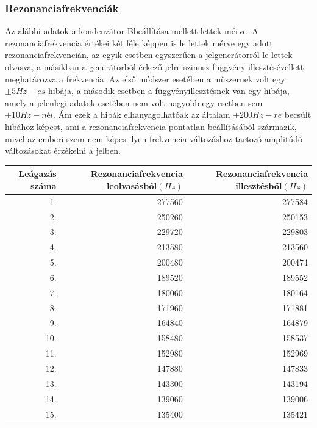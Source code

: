 \documentclass[10pt,pdftex]{report}
\begin{document}
\subsubsection{Rezonanciafrekvenciák}
Az alábbi adatok a kondenzátor B\footnotemark beállítása mellett lettek mérve.\newline
A rezonanciafrekvencia értékei két féle képpen is le lettek mérve egy adott rezonanciafrekvencián, az egyik esetben egyszerűen a jelgenerátorról le lettek olvasva, a másikban 
a generátorból érkező jelre szinusz függvény illesztésével\footnotemark lett meghatározva a frekvencia. Az első módszer esetében a műszernek volt egy $\pm5Hz-es$ hibája, a második esetben 
a függvényillesztésnek van egy hibája, amely a jelenlegi adatok esetében nem volt nagyobb egy esetben sem $\pm10Hz-nél$. Ám ezek a hibák elhanyagolhatóak az általam $\pm200Hz-re$ 
becsült hibához képest, ami a rezonanciafrekvencia pontatlan beállításából származik, mivel az emberi szem nem képes ilyen frekvencia változáshoz tartozó amplitúdó változásokat 
érzékelni a jelben.  \newline
\begin{centering}
    \centering
    \begin{tabular}{|r|r|r|}
        \hline
        Leágazás száma & Rezonanciafrekvencia leolvasásból$(Hz)$ & Rezonanciafrekvencia illesztésből$(Hz)$ \\
        \hline
        1. & 277560 & 277584 \\
        \hline
        2. & 250260 & 250153 \\
        \hline
        3. & 229720 & 229803 \\
        \hline
        4. & 213580 & 213560 \\
        \hline
        5. & 200480 & 200474 \\
        \hline
        6. & 189520 & 189552 \\
        \hline
        7. & 180060 & 180164 \\
        \hline
        8. & 171960 & 171881 \\
        \hline
        9. & 164840 & 164879 \\
        \hline
        10. & 158480 & 158537 \\
        \hline
        11. & 152980 & 152969 \\
        \hline
        12. & 147880 & 147833 \\
        \hline
        13. & 143300 & 143194 \\
        \hline
        14. & 139060 & 139006 \\
        \hline
        15. & 135400 & 135421 \\
        \hline
    \end{tabular}
\end{centering}
\end{document}
